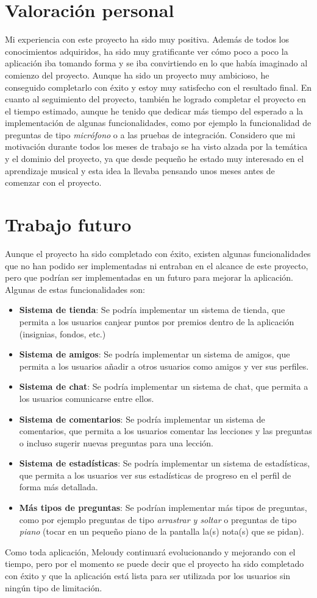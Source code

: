 \section{Valoración personal}
\label{sec:valoracion_personal}
Mi experiencia con este proyecto ha sido muy positiva. Además de todos los conocimientos adquiridos, ha sido muy gratificante ver cómo poco a poco la aplicación iba tomando forma y se iba convirtiendo en lo que había imaginado al comienzo del proyecto. Aunque ha sido un proyecto muy ambicioso, he conseguido completarlo con éxito y estoy muy satisfecho con el resultado final.
En cuanto al seguimiento del proyecto, también he logrado completar el proyecto en el tiempo estimado, aunque he tenido que dedicar más tiempo del esperado a la implementación de algunas funcionalidades, como por ejemplo la funcionalidad de preguntas de tipo \textit{micrófono} o a las pruebas de integración. 
Considero que mi motivación durante todos los meses de trabajo se ha visto alzada por la temática y el dominio del proyecto, ya que desde pequeño he estado muy interesado en el aprendizaje musical y esta idea la llevaba pensando unos meses antes de comenzar con el proyecto. 
\section{Trabajo futuro}
\label{sec:trabajo_futuro}
Aunque el proyecto ha sido completado con éxito, existen algunas funcionalidades que no han podido ser implementadas ni entraban en el alcance de este proyecto, pero que podrían ser implementadas en un futuro para mejorar la aplicación. Algunas de estas funcionalidades son:
\begin{itemize}
    \item \textbf{Sistema de tienda}: Se podría implementar un sistema de tienda, que permita a los usuarios canjear puntos por premios dentro de la aplicación (insignias, fondos, etc.)
    \item \textbf{Sistema de amigos}: Se podría implementar un sistema de amigos, que permita a los usuarios añadir a otros usuarios como amigos y ver sus perfiles.
    \item \textbf{Sistema de chat}: Se podría implementar un sistema de chat, que permita a los usuarios comunicarse entre ellos.
    \item \textbf{Sistema de comentarios}: Se podría implementar un sistema de comentarios, que permita a los usuarios comentar las lecciones y las preguntas o incluso sugerir nuevas preguntas para una lección.
    \item \textbf{Sistema de estadísticas}: Se podría implementar un sistema de estadísticas, que permita a los usuarios ver sus estadísticas de progreso en el perfil de forma más detallada.
    \item \textbf{Más tipos de preguntas}: Se podrían implementar más tipos de preguntas, como por ejemplo preguntas de tipo \textit{arrastrar y soltar} o preguntas de tipo \textit{piano} (tocar en un pequeño piano de la pantalla la(s) nota(s) que se pidan).
\end{itemize}

Como toda aplicación, Meloudy continuará evolucionando y mejorando con el tiempo, pero por el momento se puede decir que el proyecto ha sido completado con éxito y que la aplicación está lista para ser utilizada por los usuarios sin ningún tipo de limitación.

